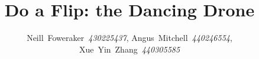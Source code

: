 \documentclass[journal]{IEEEtran}
\numberwithin{equation}{subsection}
\numberwithin{figure}{subsection}
\begin{document}
\title{Do a Flip: the Dancing Drone}
\author{Neill~Foweraker~\textit{430225437}, Angus~Mitchell~\textit{440246554}, Xue~Yin~Zhang~\textit{440305585}}
\maketitle



\begin{abstract}

\end{abstract}









\end{document}
